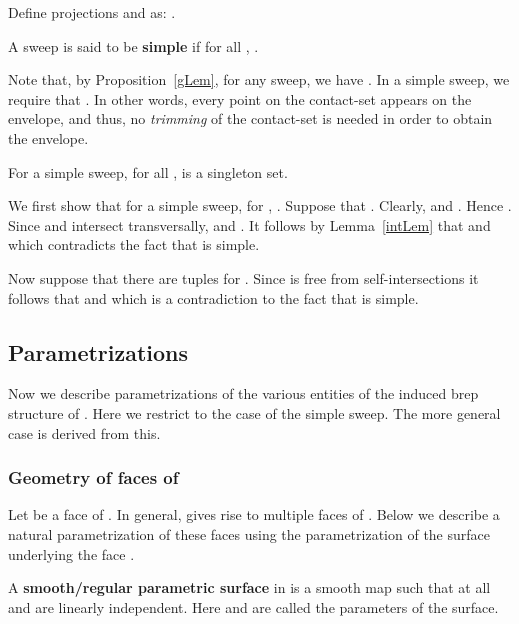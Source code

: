 \documentclass{elsart5p}
\newcommand{\eat}[1]{}
\begin{document}
\begin{defn} \label{projDef}
Define projections  
and  as:
.
\end{defn}

\begin{defn} \label{simpleDef}
A sweep  is said to be {\bf simple} if for all , 
. \end{defn} 

Note that, by Proposition~\ref{gLem}, for any sweep, we have 
. In a simple sweep, we require that .
In other words, every point on the contact-set appears on the envelope, and 
thus, no {\em trimming} of the contact-set is needed in order to obtain the envelope.

\begin{lem} \label{simpleLem}
For a simple sweep, for all ,  is a singleton set.
\end{lem}
 We first show that for a simple sweep, for 
, .  Suppose that .
Clearly,  and . 
Hence .  Since  and 
 intersect transversally,  and 
.  It follows by Lemma~\ref{intLem} that 
 and  which
contradicts the fact that  is simple.

Now suppose that there are  tuples  for .  Since  is free from self-intersections 
it follows that  and  which is a contradiction to the fact that 
 is simple.
\hfill 

\subsection{Parametrizations}	\label{paramSec}
Now we describe parametrizations of the various entities
of the induced brep structure of . Here we restrict to the
case of the simple sweep. The more general case is derived from this. 
\eat{As mentioned before, the brep  consists
of faces, edges and vertices. These geometric entities give rise to
corresponding entities on  (see Figure~\ref{coneFig}).}

\subsubsection{Geometry of faces of }\label{keynotation}
Let  be a face of . In general,  gives rise to 
multiple faces of . Below we describe a natural parametrization of
these faces using the parametrization of the surface underlying the
face .

\begin{defn} \label{parSurfDef}
A {\bf smooth/regular parametric surface} in  is a smooth map 
such that at all    
 and  are linearly independent.  Here  and  are called 
the parameters of the surface.
\end{defn}
\end{document}
